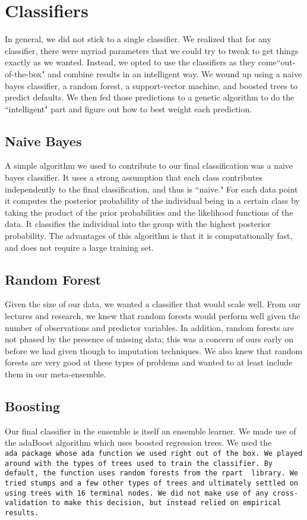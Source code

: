 \documentclass[11pt, oneside]{article}   	%
\begin{document}
\section{Classifiers}
In general, we did not stick to a single classifier. We realized that for any classifier, there were myriad
parameters that we could try to tweak to get things exactly as we wanted. Instead, we 
opted to use the classifiers as they come``out-of-the-box" and combine results in an intelligent way. 
We wound up using a naive bayes classifier, a random forest, a support-vector machine, and 
boosted trees to predict defaults. We then fed those predictions to a genetic algorithm to do
the ``intelligent" part and figure out how to best weight each prediction.
	\subsection{Naive Bayes}
	A simple algorithm we used to contribute to our final classification was a naive bayes classifier. It uses a strong assumption that each class contributes independently to the final classification, and thus is ``naive." For each data point it computes the posterior probability of the individual being in a certain class by taking the product of the prior probabilities and the likelihood functions of the data. It classifies the individual into the group with the highest posterior probability. The advantages of this algorithm is that it is computationally fast, and does not require a large training set. 
	\subsection{Random Forest}
	Given the size of our data, we wanted a classifier that would scale well. From our lectures
	and research, we knew that random forests would perform well given the number of
	observations and predictor variables. In addition, random forests are not phased by the
	presence of missing data; this was a concern of ours early on before we had given though
	to imputation techniques. We also knew that random forests are very good at these
	types of problems and wanted to at least include them in our meta-ensemble.
	\subsection{Boosting}
	Our final classifier in the ensemble is itself an ensemble learner. We made use of the
	adaBoost algorithm which uses boosted regression trees. We used the \tt ada\rm~package
	whose \tt ada\rm~function we used right out of the box. We played around with the types of
	trees used to train the classifier. By default, the function uses random forests from the \tt rpart
	\rm~library. We tried stumps and a few other types of trees and ultimately settled
	on using trees with 16 terminal nodes. We did not make use of any cross-validation
	to make this decision, but instead relied on empirical results.
\end{document}
